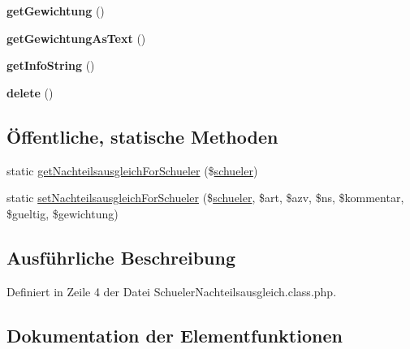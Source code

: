 \begin{DoxyCompactItemize}
\item 
\mbox{\label{class_schueler_nachteilsausgleich_ae3afe3108d76e9cea2a97102ff6385f1}} 
{\bfseries get\+Gewichtung} ()
\item 
\mbox{\label{class_schueler_nachteilsausgleich_a6230637a007c0f340613487aa401bef9}} 
{\bfseries get\+Gewichtung\+As\+Text} ()
\item 
\mbox{\label{class_schueler_nachteilsausgleich_a2d7e41b7f284dace4ae256276f8f1c5b}} 
{\bfseries get\+Info\+String} ()
\item 
\mbox{\label{class_schueler_nachteilsausgleich_ada5e0c52dcb3653999500a6466c950a2}} 
{\bfseries delete} ()
\end{DoxyCompactItemize}
\subsection*{Öffentliche, statische Methoden}
\begin{DoxyCompactItemize}
\item 
static \mbox{\hyperlink{class_schueler_nachteilsausgleich_ac622cbb8e90c76afc8654fe76abd6304}{get\+Nachteilsausgleich\+For\+Schueler}} (\$\mbox{\hyperlink{classschueler}{schueler}})
\item 
static \mbox{\hyperlink{class_schueler_nachteilsausgleich_a9c2956fe6daf996e8004a6cc6de733b9}{set\+Nachteilsausgleich\+For\+Schueler}} (\$\mbox{\hyperlink{classschueler}{schueler}}, \$art, \$azv, \$ns, \$kommentar, \$gueltig, \$gewichtung)
\end{DoxyCompactItemize}


\subsection{Ausführliche Beschreibung}


Definiert in Zeile 4 der Datei Schueler\+Nachteilsausgleich.\+class.\+php.



\subsection{Dokumentation der Elementfunktionen}
\mbox{\label{class_schueler_nachteilsausgleich_ac622cbb8e90c76afc8654fe76abd6304}} 
